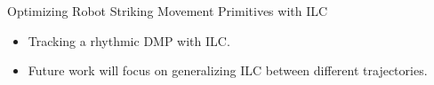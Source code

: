 \documentclass[handout]{beamer}
\begin{document}
\begin{frame}{Optimizing Robot Striking Movement Primitives with ILC}
\begin{itemize}
\item Tracking a rhythmic DMP with ILC.
\item Future work will focus on generalizing ILC between different trajectories.
\end{itemize}
\begin{figure}[ht]
\centering
{}
\label{Robot experiment} 
\end{figure}
\end{frame}
%
\end{document}

